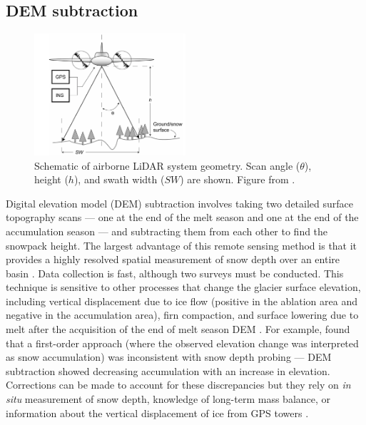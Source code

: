 \documentclass[12pt]{article}
\begin{document}
\subsection{DEM subtraction}
\begin{figure}
 \centering
      \includegraphics[width=0.5\textwidth]{lidar.png}
  \caption{Schematic of airborne LiDAR system geometry. Scan angle ($\theta$), height ($h$), and swath width ($SW$) are shown. Figure from \cite{Deems2006}.}
        \label{lidar}
\end{figure}

Digital elevation model (DEM) subtraction involves taking two detailed surface topography scans --- one at the end of the melt season and one at the end of the accumulation season --- and subtracting them from each other to find the snowpack height. The largest advantage of this remote sensing method is that it provides a highly resolved spatial measurement of snow depth over an entire basin \citep{Deems2006, Sold2013}. Data collection is fast, although two surveys must be conducted. This technique is sensitive to other processes that change the glacier surface elevation, including vertical displacement due to ice flow (positive in the ablation area and negative in the accumulation area), firn compaction, and surface lowering due to melt after the acquisition of the end of melt season DEM \citep{Sold2013}. For example, \citep{Sold2013} found that a first-order approach (where the observed elevation change was interpreted as snow accumulation) was inconsistent with snow depth probing --- DEM subtraction showed decreasing accumulation with an increase in elevation. Corrections can be made to account for these discrepancies but they rely on \textit{in situ} measurement of snow depth, knowledge of long-term mass balance, or information about the vertical displacement of ice from GPS towers \citep{Sold2013}. 
\end{document}
